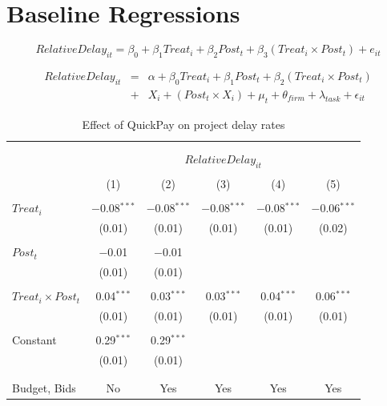 \documentclass[
]{article}
\begin{document}
\hypertarget{baseline-regressions}{%
\section{Baseline Regressions}\label{baseline-regressions}}

\[ RelativeDelay_{it} = \beta_0 + \beta_1 Treat_i + \beta_2 Post_t + \beta_3 (Treat_i \times Post_t) + e_{it}\]

\[ \begin{aligned} RelativeDelay_{it} &=& \alpha+\beta_0 Treat_i + \beta_1 Post_t + \beta_2 (Treat_i \times Post_t)\\
&+&  X_i + (Post_t \times X_i) + \mu_t + \theta_{firm} + \lambda_{task}+ \epsilon_{it}
\end{aligned}\]

\begin{table}[H] \centering 
  \caption{Effect of QuickPay on project delay rates} 
  \label{} 
\small 
\begin{tabular}{@{\extracolsep{-2pt}}lccccc} 
\\[-1.8ex]\hline 
\hline \\[-1.8ex] 
\\[-1.8ex] & \multicolumn{5}{c}{$RelativeDelay_{it}$} \\ 
\\[-1.8ex] & (1) & (2) & (3) & (4) & (5)\\ 
\hline \\[-1.8ex] 
 $Treat_i$ & $-$0.08$^{***}$ & $-$0.08$^{***}$ & $-$0.08$^{***}$ & $-$0.08$^{***}$ & $-$0.06$^{***}$ \\ 
  & (0.01) & (0.01) & (0.01) & (0.01) & (0.02) \\ 
  & & & & & \\ 
 $Post_t$ & $-$0.01 & $-$0.01 &  &  &  \\ 
  & (0.01) & (0.01) &  &  &  \\ 
  & & & & & \\ 
 $Treat_i \times Post_t$ & 0.04$^{***}$ & 0.03$^{***}$ & 0.03$^{***}$ & 0.04$^{***}$ & 0.06$^{***}$ \\ 
  & (0.01) & (0.01) & (0.01) & (0.01) & (0.01) \\ 
  & & & & & \\ 
 Constant & 0.29$^{***}$ & 0.29$^{***}$ &  &  &  \\ 
  & (0.01) & (0.01) &  &  &  \\ 
  & & & & & \\ 
\hline \\[-1.8ex] 
Budget, Bids & No & Yes & Yes & Yes & Yes \\ 

\end{tabular}
\end{table}
\end{document}
